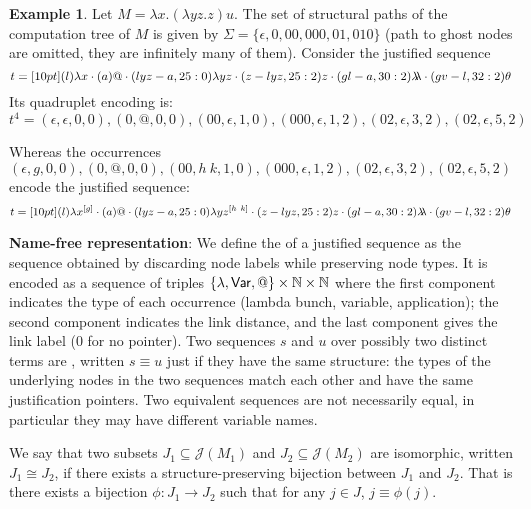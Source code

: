 \documentclass{article}
\theoremstyle{definition}
\newtheorem{example}{Example}[section]
\newcommand{\ghostlmd}{{\lambda\!\!\lambda}}
\newcommand{\ghostvar}{\theta}
\def\justseqset{\mathcal{J}}
\begin{document}
\begin{example}
\label{examp:ghost_materialization}
    Let $M = \lambda x. (\lambda y z.z) u$. The set of structural paths of the computation tree of $M$ is given by $\Sigma = \{\epsilon, 0, 00,000, 01,010\}$ (path to ghost nodes are omitted, they are infinitely many of them).
    Consider the justified sequence
    $$t = \Pstr[10pt]{
        (l){\lambda x} \cdot (a)@ \cdot (lyz-a,25:0){\lambda y z} \cdot (z-lyz,25:2)z \cdot (gl-a,30:2)\ghostlmd \cdot (gv-l,32:2)\ghostvar }
    $$
    Its quadruplet encoding is:
    $$ t^4= (\epsilon, \epsilon ,0,0), (0,@,0,0), (00, \epsilon, 1,0), (000,\epsilon, 1,2), (02,\epsilon,3,2), (02,\epsilon,5,2) $$

    Whereas the occurrences $ (\epsilon, g ,0,0), (0,@,0,0), (00, h~k, 1,0), (000,\epsilon, 1,2), (02,\epsilon,3,2), (02,\epsilon,5,2) $ encode the justified sequence:
    $$t = \Pstr[10pt]{
        (l){\lambda x^{[g]}} \cdot (a)@ \cdot (lyz-a,25:0){\lambda y z^{[h~k]}} \cdot (z-lyz,25:2)z \cdot (gl-a,30:2)\ghostlmd \cdot (gv-l,32:2)\ghostvar }
    $$
\end{example}

{\bf Name-free representation}: We define the  of a justified sequence as the sequence obtained by discarding node labels while preserving node types. It is encoded as a sequence of triples $\{\lambda, {\sf Var}, @ \}\times\mathbb{N}\times\mathbb{N}$ where the first component indicates the type of each occurrence (lambda bunch, variable, application); the second component indicates the link distance, and the last component gives the link label ($0$ for no pointer).
Two sequences $s$ and $u$ over possibly two distinct terms are , written $s \equiv u$ just if they have the same structure: the types of the underlying nodes in the two sequences match each other and have the same justification pointers. Two equivalent sequences are not necessarily equal, in particular they may have different variable names.

We say that two subsets $J_1\subseteq \justseqset(M_1)$ and $J_2\subseteq\justseqset(M_2)$ are isomorphic, written $J_1\cong J_2$, if  there exists a structure-preserving bijection between $J_1$ and $J_2$. That is there exists a bijection $\phi :J_1\longrightarrow J_2$ such that for any $j\in J$, $j\equiv\phi(j)$.
\end{document}
